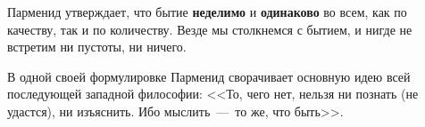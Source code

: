 
Парменид утверждает, что бытие \textbf{неделимо} и \textbf{одинаково} во всем, как по качеству, так и по количеству. Везде мы столкнемся с бытием, и нигде не встретим ни пустоты, ни ничего.

В одной своей формулировке Парменид сворачивает основную идею всей последующей западной философии: <<То, чего нет, нельзя ни познать (не удастся), ни изъяснить. Ибо мыслить~---~то же, что быть>>. 


